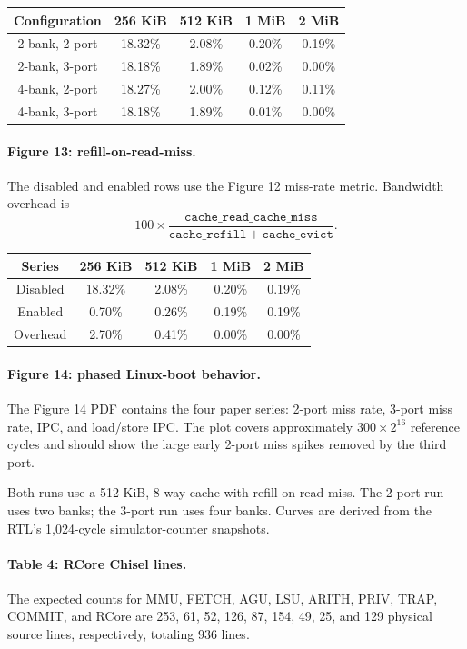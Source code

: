 \documentclass{sigplanconf}
\begin{document}
\begin{center}
\begin{tabular}{ccccc}
\hline
Configuration & 256 KiB & 512 KiB & 1 MiB & 2 MiB \\
\hline
2-bank, 2-port & 18.32\% & 2.08\% & 0.20\% & 0.19\% \\
2-bank, 3-port & 18.18\% & 1.89\% & 0.02\% & 0.00\% \\
4-bank, 2-port & 18.27\% & 2.00\% & 0.12\% & 0.11\% \\
4-bank, 3-port & 18.18\% & 1.89\% & 0.01\% & 0.00\% \\
\hline
\end{tabular}
\end{center}

\paragraph{Figure 13: refill-on-read-miss.}
The disabled and enabled rows use the Figure 12 miss-rate metric. Bandwidth
overhead is
\[
100\times
\frac{\mathtt{cache\_read\_cache\_miss}}
     {\mathtt{cache\_refill}+\mathtt{cache\_evict}}.
\]

\begin{center}
\begin{tabular}{ccccc}
\hline
Series & 256 KiB & 512 KiB & 1 MiB & 2 MiB \\
\hline
Disabled & 18.32\% & 2.08\% & 0.20\% & 0.19\% \\
Enabled  & 0.70\% & 0.26\% & 0.19\% & 0.19\% \\
Overhead & 2.70\% & 0.41\% & 0.00\% & 0.00\% \\
\hline
\end{tabular}
\end{center}

\paragraph{Figure 14: phased Linux-boot behavior.}
The Figure 14 PDF contains the four paper series: 2-port miss rate, 3-port miss
rate, IPC, and load/store IPC. The plot covers approximately
$300\times2^{16}$ reference cycles and should show the large early 2-port miss
spikes removed by the third port.

Both runs use a 512 KiB, 8-way cache with refill-on-read-miss. The 2-port run
uses two banks; the 3-port run uses four banks. Curves are derived from the
RTL's 1,024-cycle simulator-counter snapshots.

\paragraph{Table 4: RCore Chisel lines.}
The expected counts for MMU, FETCH, AGU, LSU, ARITH, PRIV, TRAP, COMMIT, and
RCore are 253, 61, 52, 126, 87, 154, 49, 25, and 129 physical source lines,
respectively, totaling 936 lines.
\end{document}
